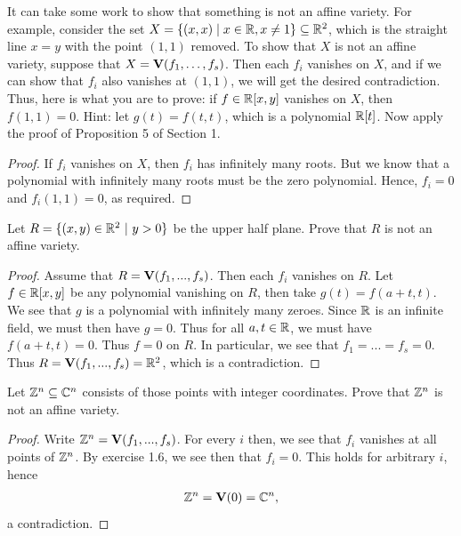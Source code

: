 \begin{exercise}{8}
It can take some work to show that something is not an affine variety. 
For example, consider the set $X=\{(x,x)\mid x\in\mathbb{R}, x\neq 1\}\subseteq\mathbb{R}^2$, which is the straight line $x=y$ with the point $(1,1)$ removed. 
To show that $X$ is not an affine variety, suppose that $X=\mathbf{V}(f_1,\dots,f_s)$. 
Then each $f_i$ vanishes on $X$, and if we can show that $f_i$ also vanishes at $(1,1)$, we will get the desired contradiction. 
Thus, here is what you are to prove: if $f\in\mathbb{R}[x,y]$ vanishes on $X$, then $f(1,1)=0$. 
Hint: let $g(t)=f(t,t)$, which is a polynomial $\mathbb{R}[t]$. 
Now apply the proof of Proposition 5 of Section 1.
\end{exercise}
\begin{proof}
 If $f_i$ vanishes on $X$, then $f_i$ has infinitely many roots. 
 But we know that a polynomial with infinitely many roots must be the zero polynomial. 
 Hence, $f_i=0$ and $f_i(1,1)=0$, as required.
\end{proof}

\begin{exercise}{9}
Let $R = \{(x,y)\in \mathbb{R}^2~\vert~y>0\}$ be the upper half plane. 
Prove that $R$ is not an affine variety.
\end{exercise}
\begin{proof}
    Assume that $R = \mathbf{V}(f_1,...,f_s)$. 
    Then each $f_i$ vanishes on $R$. 
    Let $f\in \mathbb{R}[x,y]$ be any polynomial vanishing on $R$, then take $g(t) = f(a+t,t)$. 
    We see that $g$ is a polynomial with infinitely many zeroes. 
    Since $\mathbb{R}$ is an infinite field, we must then have $g = 0$. 
    Thus for all $a,t\in \mathbb{R}$, we must have $f(a+t,t) = 0$. 
    Thus $f = 0$ on $R$. 
    In particular, we see that $f_1 = ... = f_s = 0$. 
    Thus $R = \mathbf{V}(f_1,...,f_s) = \mathbb{R}^2$, which is a contradiction.
\end{proof}

\begin{exercise}{10}
Let $\mathbb{Z}^n\subseteq \mathbb{C}^n$ consists of those points with integer coordinates. 
Prove that $\mathbb{Z}^n$ is not an affine variety.    
\end{exercise}
\begin{proof}
    Write $\mathbb{Z}^n = \mathbf{V}(f_1,...,f_s)$. 
    For every $i$ then, we see that $f_i$ vanishes at all points of $\mathbb{Z}^n$. 
    By exercise 1.6, we see then that $f_i = 0$. This holds for arbitrary $i$, hence
    \begin{align*}
        \mathbb{Z}^n = \mathbf{V}(0) = \mathbb{C}^n,
    \end{align*}
    a contradiction.
\end{proof}

